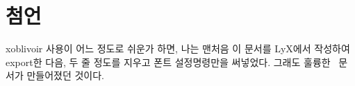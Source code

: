 \documentclass[
	12pt,
	a4paper,
	kosection,
	footnote,
	microtype,
	figtabcapt,
]{oblivoir}
\def\myLabel#1#2{\label{#1}}
\def\myPageREF#1#2{\pageref{#1}}
\def\myLabel#1#2{\label{#2}}
\def\myPageREF#1#2{\pageref{#2}}
\newcommand\xobclass{x\-ob\-liv\-oir\oblivoirallowbreak}
\def\xetexko{\XeTeX-\ko}
\begin{document}
%
%
%
%
%

\section{첨언}
\xobclass{} 사용이 어느 정도로 쉬운가 하면, 나는 맨처음 이 문서를
LyX에서 작성하여 export한 다음, 두 줄 정도를 지우고 폰트
설정명령만을 써넣었다. 그래도 훌륭한 \XeLaTeX\ 문서가 만들어졌던
것이다.
\end{document}
